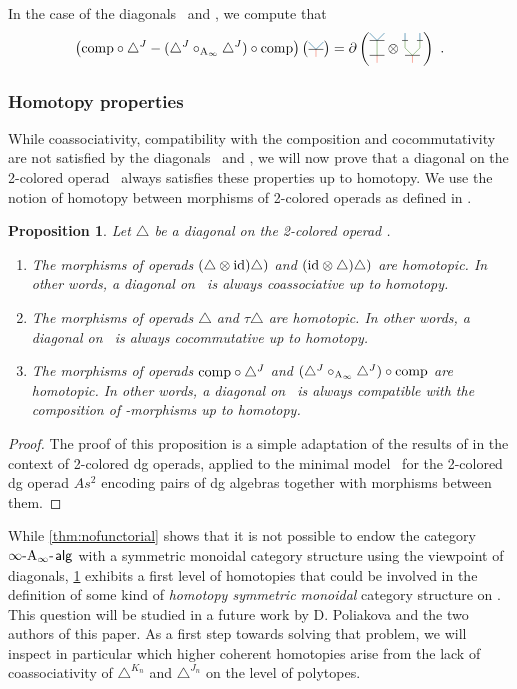 \documentclass[10pt]{amsart}
\newtheorem{proposition}[definition]{Proposition}
\theoremstyle{remark}
\begin{document}
\noindent In the case of the diagonals \diagainf\ and \diagminf , we compute that 
  \[ \left( \comp  \circ \diagminf - (\diagminf \circ_{\Ainf} \diagminf ) \circ \comp \right) \left( \arbreopdeuxmorph  \right) = \partial \left( \arbreopcompun \otimes \arbreopcompdeux \right)  \ . \]

\subsubsection{Homotopy properties}

While coassociativity, compatibility with the composition and cocommutativity are not satisfied by the diagonals \diagainf\ and \diagminf , we will now prove that a diagonal on the 2-colored operad \Ainfdeux\ always satisfies these properties up to homotopy.
We use the notion of homotopy between morphisms of 2-colored operads as defined in \cite[Section 3.10]{MSS}. 

\begin{proposition} 
\label{th:homotopy-properties}
Let $\triangle$ be a diagonal on the 2-colored operad \Ainfdeux . 
\begin{enumerate}
    \item The morphisms of operads $(\triangle \otimes \mathrm{id} ) \triangle)$ and $(\mathrm{id} \otimes \triangle) \triangle)$ are homotopic. In other words, a diagonal on \Ainfdeux\ is always coassociative up to homotopy.
    \item The morphisms of operads $\triangle$ and $\tau \triangle$ are homotopic. In other words, a diagonal on \Ainfdeux\ is always cocommutative up to homotopy.
    \item The morphisms of operads $\mathrm{comp}  \circ \triangle^{J}$ and $( \triangle^{J} \circ_{\mathrm{A}_\infty} \triangle^{J} ) \circ \mathrm{comp}$ are homotopic. In other words, a diagonal on \Ainfdeux\ is always compatible with the composition of \Ainf -morphisms up to homotopy.
\end{enumerate}
\end{proposition}

\begin{proof}
The proof of this proposition is a simple adaptation of the results of \cite[Section 2]{MarklShnider06} in the context of 2-colored dg operads, applied to the minimal model \Ainfdeux\ for the 2-colored dg operad $As^2$ encoding pairs of dg algebras together with morphisms between them.
\end{proof}

While \cref{thm:nofunctorial} shows that it is not possible to endow the category $\infty\text{-}\mathrm{A}_\infty\text{-\hspace{1pt}}\mathsf{alg}$ with a symmetric monoidal category structure using the viewpoint of diagonals, \cref{th:homotopy-properties} exhibits a first level of homotopies that could be involved in the definition of some kind of \textit{homotopy symmetric monoidal} category structure on \infAalg . 
This question will be studied in a future work by D. Poliakova and the two authors of this paper. As a first step towards solving that problem, we will inspect in particular which higher coherent homotopies arise from the lack of coassociativity of $\triangle^{K_n}$ and $\triangle^{J_n}$ on the level of polytopes. 
\end{document}
